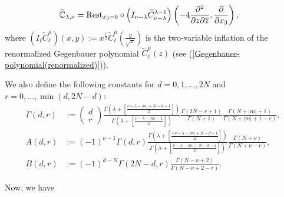 \documentclass[12pt, pdflatex, a4paper]{article}
\theoremstyle{plain}
\theoremstyle{definition}
\def\C{{\mathbb C}}
\def\Geg{\widetilde{C}}
\def\Rest{\text{\normalfont{Rest}}}
\begin{document}
\begin{equation}\label{def-operator-Ctilda}
\begin{aligned}
\widetilde{\C}_{\lambda, \nu} & = \Rest_{x_3 = 0} \circ \left(I_{\nu-\lambda} \widetilde{C}^{\lambda-1}_{\nu-\lambda}\right)\left(-4\frac{\partial^2}{\partial z \partial \overline{z}}, \frac{\partial}{\partial x_3}\right),
\end{aligned}
\end{equation}
where $(I_\ell\Geg_\ell^\mu)(x,y) := x^{\frac{\ell}{2}}\Geg_\ell^\mu\left(\frac{y}{\sqrt{x}}\right)$ is the two-variable inflation of the renormalized Gegenbauer polynomial $\Geg_\ell^\mu(z)$ (see (\ref{Gegenbauer-polynomial(renormalized)})). 

We also define the following constants for $d = 0, 1, \ldots, 2N$ and $r = 0, \ldots, \min(d, 2N-d)$:
\begin{equation}\label{const-AB}
\begin{aligned}
\Gamma(d, r) &:= \begin{pmatrix}
d\\
r
\end{pmatrix}
\frac{\Gamma\left(\lambda+\left[\frac{\nu-\lambda-|m|+N-d-1}{2}\right]\right)}{\Gamma\left(\lambda+\left[\frac{\nu-\lambda-|m|-1}{2}\right]\right)}
\frac{\Gamma(2N-r+1)}{\Gamma(N+1)}\frac{\Gamma(N+|m|+1)}{\Gamma(N+|m|+1-r)},\\[6pt]
A(d, r) &:= (-1)^{\nu-1}\Gamma(d,r)\frac{\Gamma\left(\lambda+\left[\frac{-\nu-\lambda-|m|+N-d+1}{2}\right]\right)}{\Gamma\left(\lambda+\left[\frac{\nu-\lambda-|m|+N-d-1}{2}\right]\right)}\frac{\Gamma(N+\nu)}{\Gamma(N+\nu-r)}, \\[6pt]
B(d, r) &:= (-1)^{d-N}\Gamma(2N-d, r)\frac{\Gamma(N-\nu+2)}{\Gamma(N-\nu+2-r)}.
\end{aligned}
\end{equation}

Now, we have
\end{document}
